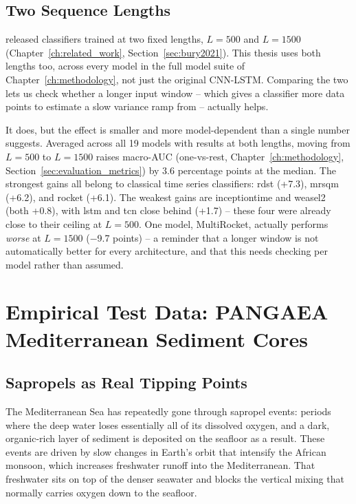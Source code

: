 \subsection{Two Sequence Lengths}

\citet{bury2021} released classifiers trained at two fixed lengths, $L=500$ and $L=1500$ (Chapter~\ref{ch:related_work}, Section~\ref{sec:bury2021}). This thesis uses both lengths too, across every model in the full model suite of Chapter~\ref{ch:methodology}, not just the original CNN-LSTM. Comparing the two lets us check whether a longer input window -- which gives a classifier more data points to estimate a slow variance ramp from -- actually helps.

It does, but the effect is smaller and more model-dependent than a single number suggests. Averaged across all 19 models with results at both lengths, moving from $L=500$ to $L=1500$ raises macro-AUC (one-vs-rest, Chapter~\ref{ch:methodology}, Section~\ref{sec:evaluation_metrics}) by 3.6 percentage points at the median. The strongest gains all belong to classical time series classifiers: rdst (+7.3), mrsqm (+6.2), and rocket (+6.1). The weakest gains are inceptiontime and weasel2 (both +0.8), with lstm and tcn close behind (+1.7) -- these four were already close to their ceiling at $L=500$. One model, MultiRocket, actually performs \emph{worse} at $L=1500$ ($-$9.7 points) -- a reminder that a longer window is not automatically better for every architecture, and that this needs checking per model rather than assumed.

\section{Empirical Test Data: PANGAEA Mediterranean Sediment Cores}
\label{sec:pangaea_data}

\subsection{Sapropels as Real Tipping Points}

The Mediterranean Sea has repeatedly gone through sapropel events: periods where the deep water loses essentially all of its dissolved oxygen, and a dark, organic-rich layer of sediment is deposited on the seafloor as a result. These events are driven by slow changes in Earth's orbit that intensify the African monsoon, which increases freshwater runoff into the Mediterranean. That freshwater sits on top of the denser seawater and blocks the vertical mixing that normally carries oxygen down to the seafloor.

